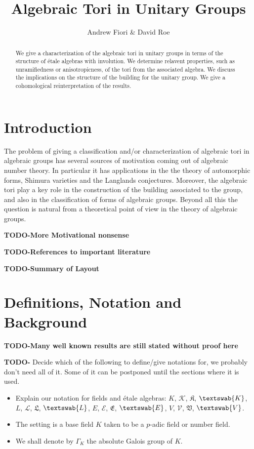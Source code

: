 \documentclass{article}
\title{Algebraic Tori in Unitary Groups}
\author{Andrew Fiori \& David Roe}
\theoremstyle{plain}
\theoremstyle{definition}
\numberwithin{equation}{section}
\newcommand{\GalKbK}{\Gamma_K}
\newcommand{\TODO}[1]{\textbf{TODO-#1}}
\newcommand{\aK}{K}
\newcommand{\gK}{\mathcal{K}}
\newcommand{\lK}{\mathfrak{K}}
\newcommand{\fK}{\textswab{K}}
\newcommand{\aL}{L}
\newcommand{\gL}{\mathcal{L}}
\newcommand{\lL}{\mathfrak{L}}
\newcommand{\fL}{\textswab{L}}
\newcommand{\aE}{E}
\newcommand{\gE}{\mathcal{E}}
\newcommand{\lE}{\mathfrak{E}}
\newcommand{\fE}{\textswab{E}}
\newcommand{\aV}{V}
\newcommand{\gV}{\mathcal{V}}
\newcommand{\lV}{\mathfrak{V}}
\newcommand{\fV}{\textswab{V}}
\begin{document}
\maketitle

\begin{abstract}
We give a characterization of the algebraic tori in unitary groups in terms of the structure of \'etale algebras with involution. We determine relavent properties, such as unramifiedness or anisotropicness, of the tori from the associated algebra. We discuss the implications on the structure of the building for the unitary group. We give a cohomological reinterpretation of the results.
\end{abstract}

\tableofcontents

\section{Introduction}

The problem of giving a classification and/or characterization of algebraic tori in algebraic groups has several sources of motivation coming out of algebraic number theory. In particular it has applications in the the theory of automorphic forms, Shimura varieties and the Langlands conjectures. Moreover, the algebraic tori play a key role in the construction of the building associated to the group, and also in the classification of forms of algebraic groups. Beyond all this the question is natural from a theoretical point of view in the theory of algebraic groups.  

\TODO{More Motivational nonsense}

\TODO{References to important literature}

\TODO{Summary of Layout}

\section{Definitions, Notation and Background}

\TODO{Many well known results are still stated without proof here}

\TODO{} Decide which of the following to define/give notations for, we probably don't need all of it. Some of it can be postponed until the sections where it is used.
\begin{itemize}
\item Explain our notation for fields and \'etale algebras: $\aK$, $\gK$, $\lK$, $\fK$, $\aL$, $\gL$, $\lL$, $\fL$, $\aE$, $\gE$, $\lE$, $\fE$, $\aV$, $\gV$, $\lV$, $\fV$.
\item The setting is a base field $K$ taken to be a $p$-adic field or number field.
\item We shall denote by $\GalKbK$ the absolute Galois group of $K$.


\end{itemize}
\end{document}
